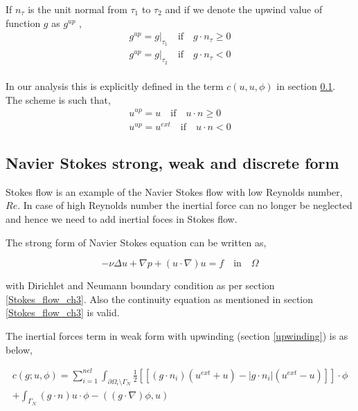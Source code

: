 \documentclass[a4paper]{book}
\begin{document}
If $n_\tau$ is the unit normal from $\tau_1$ to $\tau_2$ and if we denote the upwind value of function $g$ as $g^{up}$ \cite{riviere},
\begin{equation}
\begin{split}
g^{up} = g|_{\tau_1} \quad \textrm{if} \quad g \cdot n_\tau \geq 0 \\
g^{up} = g|_{\tau_2} \quad \textrm{if} \quad g \cdot n_\tau < 0
\end{split}
\end{equation}
\\
In our analysis this is explicitly defined in the term $c(u,u,\phi)$ in section \ref{n_s_ch3}. The scheme is such that,
\begin{equation}
\begin{split}
u^{up} = u \quad \textrm{if} \quad u \cdot n \geq 0 \\
u^{up} = u^{ext} \quad \textrm{if} \quad u \cdot n < 0
\end{split}
\end{equation}

\subsection{Navier Stokes strong, weak and discrete form} \label{n_s_ch3}

Stokes flow is an example of the Navier Stokes flow with low Reynolds number, $Re$. In case of high Reynolds number the inertial force can no longer be neglected and hence we need to add inertial foces in Stokes flow. 

The strong form of Navier Stokes equation can be written as,

\begin{equation} \label{navier_stokes_strong_ch3}
-\nu \Delta u + \nabla p + (u \cdot \nabla) u = f \quad \textrm{in} \quad \Omega
\end{equation}

with Dirichlet and Neumann boundary condition as per section \ref{Stokes_flow_ch3}. Also the continuity equation as mentioned in section \ref{Stokes_flow_ch3} is valid.

The inertial forces term in weak form with upwinding (section \ref{upwinding}) is as below,

\begin{equation}
\begin{split}
c(g;u,\phi) = \sum_{i=1}^{nel} \int_{\partial \Omega_i \setminus \Gamma_N} \frac{1}{2} [[(g \cdot n_i)(u^{ext} + u) - |g \cdot n_i|(u^{ext} - u)]] \cdot \phi \\ + \int_{\Gamma_N} (g\cdot n) u \cdot \phi -((g\cdot \nabla)\phi,u)
\end{split}
\end{equation}
\end{document}
